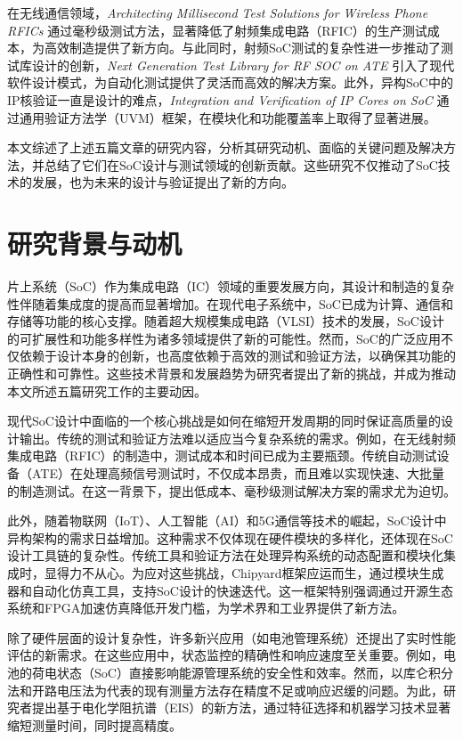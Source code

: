 \documentclass[12pt,hyperref,a4paper,UTF8]{ctexart}
\begin{document}
在无线通信领域，\textit{Architecting Millisecond Test Solutions for Wireless Phone RFICs} 通过毫秒级测试方法，显著降低了射频集成电路（RFIC）的生产测试成本，为高效制造提供了新方向\cite{1041873}。与此同时，射频SoC测试的复杂性进一步推动了测试库设计的创新，\textit{Next Generation Test Library for RF SOC on ATE} 引入了现代软件设计模式，为自动化测试提供了灵活而高效的解决方案\cite{9461580}。此外，异构SoC中的IP核验证一直是设计的难点，\textit{Integration and Verification of IP Cores on SoC} 通过通用验证方法学（UVM）框架，在模块化和功能覆盖率上取得了显著进展\cite{9641547}。

本文综述了上述五篇文章的研究内容，分析其研究动机、面临的关键问题及解决方法，并总结了它们在SoC设计与测试领域的创新贡献。这些研究不仅推动了SoC技术的发展，也为未来的设计与验证提出了新的方向。

\section{研究背景与动机}
片上系统（SoC）作为集成电路（IC）领域的重要发展方向，其设计和制造的复杂性伴随着集成度的提高而显著增加\cite{8000621}。在现代电子系统中，SoC已成为计算、通信和存储等功能的核心支撑。随着超大规模集成电路（VLSI）技术的发展，SoC设计的可扩展性和功能多样性为诸多领域提供了新的可能性。然而，SoC的广泛应用不仅依赖于设计本身的创新，也高度依赖于高效的测试和验证方法，以确保其功能的正确性和可靠性。这些技术背景和发展趋势为研究者提出了新的挑战，并成为推动本文所述五篇研究工作的主要动因。

现代SoC设计中面临的一个核心挑战是如何在缩短开发周期的同时保证高质量的设计输出。传统的测试和验证方法难以适应当今复杂系统的需求。例如，在无线射频集成电路（RFIC）的制造中，测试成本和时间已成为主要瓶颈\cite{9904916}。传统自动测试设备（ATE）在处理高频信号测试时，不仅成本昂贵，而且难以实现快速、大批量的制造测试\cite{1041873}。在这一背景下，提出低成本、毫秒级测试解决方案的需求尤为迫切。

此外，随着物联网（IoT）、人工智能（AI）和5G通信等技术的崛起，SoC设计中异构架构的需求日益增加。这种需求不仅体现在硬件模块的多样化，还体现在SoC设计工具链的复杂性。传统工具和验证方法在处理异构系统的动态配置和模块化集成时，显得力不从心。为应对这些挑战，Chipyard框架应运而生，通过模块生成器和自动化仿真工具，支持SoC设计的快速迭代\cite{9099108}。这一框架特别强调通过开源生态系统和FPGA加速仿真降低开发门槛，为学术界和工业界提供了新方法。

除了硬件层面的设计复杂性，许多新兴应用（如电池管理系统）还提出了实时性能评估的新需求。在这些应用中，状态监控的精确性和响应速度至关重要。例如，电池的荷电状态（SoC）直接影响能源管理系统的安全性和效率。然而，以库仑积分法和开路电压法为代表的现有测量方法存在精度不足或响应迟缓的问题。为此，研究者提出基于电化学阻抗谱（EIS）的新方法，通过特征选择和机器学习技术显著缩短测量时间，同时提高精度\cite{10227269}。
\end{document}
